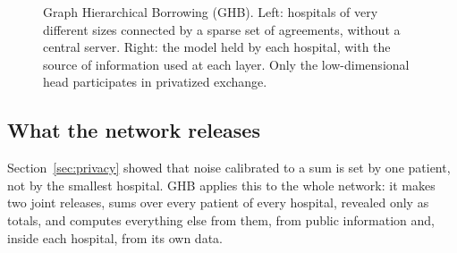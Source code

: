 \documentclass[acmsmall,screen,review]{acmart}
\theoremstyle{acmdefinition}
\begin{document}
\begin{figure}[t]
\caption{Graph Hierarchical Borrowing (GHB). Left: hospitals of very different sizes connected by a sparse set of agreements, without a central server. Right: the model held by each hospital, with the source of information used at each layer. Only the low-dimensional head participates in privatized exchange.}
\label{fig:ghb}
\end{figure}

\subsection{What the network releases}\label{sec:logit}

Section~\ref{sec:privacy} showed that noise calibrated to a sum is set by one patient, not by the smallest hospital. GHB applies this to the whole network: it makes two joint releases, sums over every patient of every hospital, revealed only as totals, and computes everything else from them, from public information and, inside each hospital, from its own data.
\end{document}
